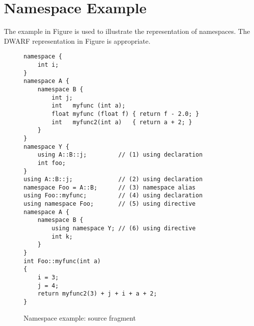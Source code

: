 \section{Namespace Example}
\label{app:namespaceexample}

The  example in 
Figure 
is used 
to illustrate the representation of namespaces.
The DWARF representation in 
Figure 
is appropriate.

\begin{figure}[p]
\begin{lstlisting}
namespace {
    int i;
}
namespace A {
    namespace B {
        int j;
        int   myfunc (int a);
        float myfunc (float f) { return f - 2.0; }
        int   myfunc2(int a)   { return a + 2; }
    }
}
namespace Y {
    using A::B::j;         // (1) using declaration
    int foo;
}
using A::B::j;             // (2) using declaration
namespace Foo = A::B;      // (3) namespace alias
using Foo::myfunc;         // (4) using declaration
using namespace Foo;       // (5) using directive
namespace A {
    namespace B {
        using namespace Y; // (6) using directive
        int k;
    }
}
int Foo::myfunc(int a)
{
    i = 3;
    j = 4;
    return myfunc2(3) + j + i + a + 2;
}
\end{lstlisting}
\caption{Namespace example: source fragment}
\label{fig:namespaceexamplesourcefragment}
\end{figure}



